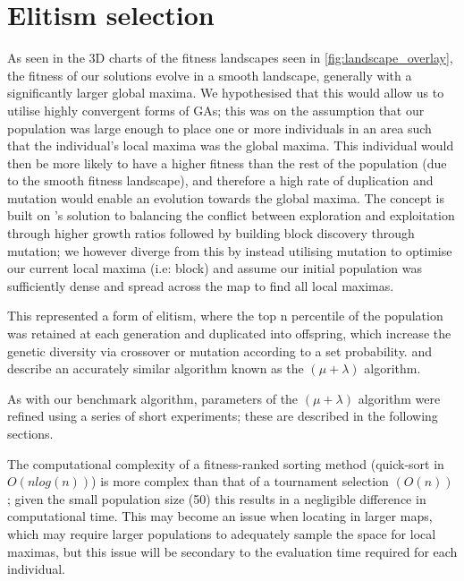 \documentclass[authoryearcitations]{UoYCSproject}
\begin{document}
\section{Elitism selection}
\label{subsec:elitism_sel}
As seen in the 3D charts of the fitness landscapes seen in \autoref{fig:landscape_overlay}, the fitness of our solutions evolve in a smooth landscape, generally with a significantly larger global maxima. We hypothesised that this would allow us to utilise highly convergent forms of GAs; this was on the assumption that our population was large enough to place one or more individuals in an area such that the individual's local maxima was the global maxima. This individual would then be more likely to have a higher fitness than the rest of the population (due to the smooth fitness landscape), and therefore a high rate of duplication and mutation would enable an evolution towards the global maxima. The concept is built on \citet{David_E_Goldberg1991-es}'s solution to balancing the conflict between exploration and exploitation through higher growth ratios followed by building block discovery through mutation; we however diverge from this by instead utilising mutation to optimise our current local maxima (i.e: block) and assume our initial population was sufficiently dense and spread across the map to find all local maximas.
	
This represented a form of elitism, where the top n percentile of the population was retained at each generation and duplicated into offspring, which increase the genetic diversity via crossover or mutation according to a set probability. \citet{T_Back_D_B_Fogel_T_Michalewicz} and \citet{Shapiro1992-qm} describe an accurately similar algorithm known as the $(\mu + \lambda)$  algorithm.

As with our benchmark algorithm, parameters of the $(\mu + \lambda)$ algorithm were refined using a series of short experiments; these are described in the following sections.

The computational complexity of a fitness-ranked sorting method (quick-sort in $O(n log (n))$) is more complex  \cite{Mitchell1998-td} than that of a tournament selection $(O(n))$ \cite{David_E_Goldberg1991-es}; given the small population size (50) this results in a negligible difference in computational time. This may become an issue when locating in larger maps, which may require larger populations to adequately sample the space for local maximas, but this issue will be secondary to the evaluation time required for each individual.
\end{document}
